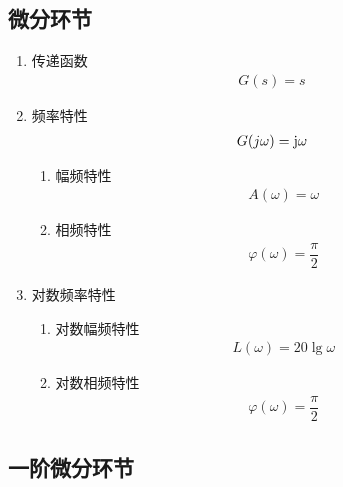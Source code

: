 \subsection{微分环节}
\begin{enumerate}[1.]
	\item 传递函数
	\vspace*{-0.5em}
	\begin{align}
		G(s) = s
	\end{align}
	\vspace*{-3em}
	
	\item 频率特性
	\vspace*{-0.5em}
	\begin{align}
		G(j\omega) = \text{j} \omega 
	\end{align}
	\vspace*{-3em}
	\begin{enumerate}[(1) ]
		\item 幅频特性
		\vspace*{-0.5em}
		\begin{align}
			A(\omega) = \omega
		\end{align}
		\vspace*{-3em}
		
		\item 相频特性
		\vspace*{-0.5em}
		\begin{align}
			\varphi(\omega) = \dfrac{\pi}{2}
		\end{align}
		\vspace*{-3em}
	\end{enumerate}
	\item 对数频率特性
	\begin{enumerate}[(1) ]
		\item 对数幅频特性
		\vspace*{-0.5em}
		\begin{align}
			L(\omega) = 20 \lg \omega
		\end{align}
		\vspace*{-3em}
		\item 对数相频特性
		\vspace*{-0.5em}
		\begin{align}
			\varphi(\omega) = \dfrac{\pi}{2}
		\end{align}
		\vspace*{-3em}
	\end{enumerate}
\end{enumerate}

\subsection{一阶微分环节}

